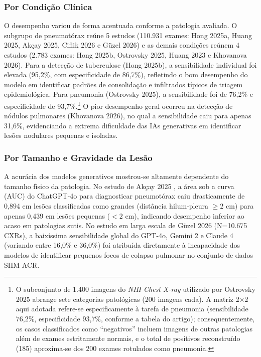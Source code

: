 \documentclass[12pt,a4paper]{article}
\begin{document}
\subsubsection{Por Condição Clínica}
O desempenho variou de forma acentuada conforme a patologia avaliada. O subgrupo de pneumotórax reúne 5 estudos (110.931 exames: Hong 2025a, Huang 2025, Akçay 2025, Ciflik 2026 e Güzel 2026) e as demais condições reúnem 4 estudos (2.783 exames: Hong 2025b, Ostrovsky 2025, Huang 2023 e Khovanova 2026). Para a detecção de tuberculose (Hong 2025b), a sensibilidade individual foi elevada (95,2\%, com especificidade de 86,7\%), refletindo o bom desempenho do modelo em identificar padrões de consolidação e infiltrados típicos de triagem epidemiológica. Para pneumonia (Ostrovsky 2025), a sensibilidade foi de 76,2\% e especificidade de 93,7\%.\footnote{O subconjunto de 1.400 imagens do \textit{NIH Chest X-ray} utilizado por Ostrovsky 2025 abrange sete categorias patológicas (200 imagens cada). A matriz 2$\times$2 aqui adotada refere-se especificamente à tarefa de pneumonia (sensibilidade 76,2\%, especificidade 93,7\%, conforme a tabela do artigo); consequentemente, os casos classificados como ``negativos'' incluem imagens de outras patologias além de exames estritamente normais, e o total de positivos reconstruído (185) aproxima-se dos 200 exames rotulados como pneumonia.} O pior desempenho geral ocorreu na detecção de nódulos pulmonares (Khovanova 2026), no qual a sensibilidade caiu para apenas 31,6\%, evidenciando a extrema dificuldade das IAs generativas em identificar lesões nodulares pequenas e isoladas.

\subsubsection{Por Tamanho e Gravidade da Lesão}
A acurácia dos modelos generativos mostrou-se altamente dependente do tamanho físico da patologia. No estudo de Akçay 2025 \cite{akcay}, a área sob a curva (AUC) do ChatGPT-4o para diagnosticar pneumotórax caiu drasticamente de 0,894 em lesões classificadas como grandes (distância hilum-pleura $\ge 2$ cm) para apenas 0,439 em lesões pequenas ($< 2$ cm), indicando desempenho inferior ao acaso em patologias sutis. No estudo em larga escala de Güzel 2026 \cite{guzel} (N=10.675 CXRs), a baixíssima sensibilidade global do GPT-4o, Gemini 2 e Claude 4 (variando entre 16,0\% e 36,0\%) foi atribuída diretamente à incapacidade dos modelos de identificar pequenos focos de colapso pulmonar no conjunto de dados SIIM-ACR.
\end{document}
